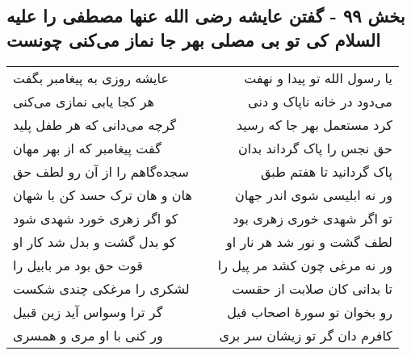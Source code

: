 \begin{center}
\section*{بخش ۹۹ - گفتن عایشه رضی الله عنها مصطفی را علیه السلام کی تو بی مصلی بهر جا نماز می‌کنی چونست}
\label{sec:sh099}
\begin{longtable}{l p{0.5cm} r}
عایشه روزی به پیغامبر بگفت
&&
یا رسول الله تو پیدا و نهفت
\\
هر کجا یابی نمازی می‌کنی
&&
می‌دود در خانه ناپاک و دنی
\\
گرچه می‌دانی که هر طفل پلید
&&
کرد مستعمل بهر جا که رسید
\\
گفت پیغامبر که از بهر مهان
&&
حق نجس را پاک گرداند بدان
\\
سجده‌گاهم را از آن رو لطف حق
&&
پاک گردانید تا هفتم طبق
\\
هان و هان ترک حسد کن با شهان
&&
ور نه ابلیسی شوی اندر جهان
\\
کو اگر زهری خورد شهدی شود
&&
تو اگر شهدی خوری زهری بود
\\
کو بدل گشت و بدل شد کار او
&&
لطف گشت و نور شد هر نار او
\\
قوت حق بود مر بابیل را
&&
ور نه مرغی چون کشد مر پیل را
\\
لشکری را مرغکی چندی شکست
&&
تا بدانی کان صلابت از حقست
\\
گر ترا وسواس آید زین قبیل
&&
رو بخوان تو سورهٔ اصحاب فیل
\\
ور کنی با او مری و همسری
&&
کافرم دان گر تو زیشان سر بری
\\
\end{longtable}
\end{center}
